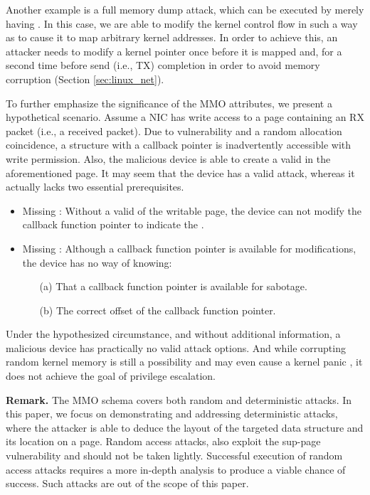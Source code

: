 Another example is a full memory dump attack, which can be executed by merely having \oportunity. In this case, we are able to modify the kernel control flow in such a way as to cause it to map arbitrary kernel addresses. In order to achieve this, an attacker needs to modify a kernel pointer once before it is mapped and, for a second time before send (i.e., TX) completion in order to avoid memory corruption (Section \ref{sec:linux_net}). 

To further emphasize the significance of the MMO attributes, we present a hypothetical scenario. Assume a NIC has write access to a page containing an RX packet (i.e., a received packet). Due to \subpage{} vulnerability and a random allocation coincidence, a structure with a callback pointer is inadvertently accessible with write permission. Also, the malicious device is able to create a valid \mabaf{} in the aforementioned page. It may seem that the device has a valid attack, whereas it actually lacks two essential prerequisites.

\begin{itemize}
    \item Missing \means: Without a valid \kva{} of the writable page, the device can not modify the callback function pointer to indicate the \mabaf.
    \item Missing \oportunity: Although a callback function pointer is available for modifications, the device has no way of knowing: 
    \begin{enumerate}
        \item[(a)] That a callback function pointer is available for sabotage.
        \item[(b)] The correct offset of the callback function pointer.
    \end{enumerate}
\end{itemize}

Under the hypothesized circumstance, and without additional information, a malicious device has practically no valid attack options. 
And while corrupting random kernel memory is still a possibility and may even cause a kernel panic \cite{MMT16}, it does not achieve the goal of privilege escalation.


\smallskip
\noindent\textbf{Remark.} The MMO schema covers both random and deterministic attacks. In this paper, we focus on demonstrating and addressing deterministic attacks, where the attacker is able to deduce the layout of the targeted data structure and its location on a page. Random access attacks, also exploit the sup-page vulnerability and should not be taken lightly. Successful execution of random access attacks requires a more in-depth analysis to produce a viable chance of success. Such attacks are out of the scope of this paper. 

